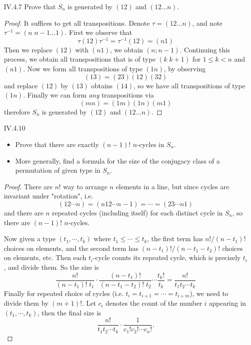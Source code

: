 \begin{problem}{IV.4.7}
Prove that $S_n$ is generated by $(12)$ and $(12\dotsc n)$.
\end{problem}
\begin{proof}
It suffices to get all transpositions. Denote $\tau = (12\dotsc n)$, and note $\tau^{-1}=(n \; n-1 \dotsc 1)$. First we observe that 
\[
\tau(12)\tau^{-1} = \tau^{-1}(12) = (n 1)
\]
Then we replace $(12)$ with $(n 1)$, we obtain $(n ; n-1)$. Continuing this process, we obtain all transpositions that is of type $(k \; k+1)$ for $1 \leq k < n$ and $(n 1)$. Now we form all transpositions of type $(1 n)$, by observing
\[
(1 3) = (2 3)(1 2)(3 2)	
\]
and replace $(1 2)$ by $(1 3)$ obtains $(1 4)$, so we have all transpositions of type $(1 n)$. Finally we can form \emph{any} transpositions via
\[
(m n) = (1 m)(1 n)(m 1)	
\]
therefore $S_n$ is generated by $(12)$ and $(12\dotsc n)$.
\end{proof}

\begin{problem}{IV.4.10} \
\begin{itemize}
\setlength\itemsep{0pt}
\item Prove that there are exactly $(n-1)!$ $n$-cycles in $S_n$.
\item More generally, find a formula for the size of the conjugacy class of a permutation of given type in $S_n$.
\end{itemize}
\end{problem}
\begin{proof}
There are $n!$ way to arrange $n$ elements in a line, but since cycles are invariant under "rotation", i.e.
\[
(1 2 \cdots n) = (n 1 2 \cdots n-1) = \cdots = (2 3 \cdots n 1)	
\]
and there are $n$ repeated cycles (including itself) for each distinct cycle in $S_n$, so there are $(n-1)!$ $n$-cycles.

Now given a type $(t_1,\cdots ,t_k)$ where $t_1 \leq \cdots \leq t_k$, the first term has $n!/(n-t_1)!$ choices on elements, and the second term has $(n-t_1)!/(n-t_1-t_2)!$ choices on elements, etc. Then each $t_i$-cycle counts its repeated cycle, which is precisely $t_i$, and divide them. So the size is
\[
\frac{n!}{(n-t_1)!\;t_1} \cdot \frac{(n-t_1)!}{(n-t_1-t_2)!\;t_2} \cdots \frac{t_k!}{t_k} = \frac{n!}{t_1 t_2 \cdots t_k}
\]
Finally for repeated choice of cycles (i.e. $t_i = t_{i+1} = \cdots = t_{i+m}$), we need to divide them by $(m+1)!$. Let $c_i$ denotes the count of the number $i$ appearing in $(t_1,\cdots ,t_k)$, then the final size is
\[
\frac{n!}{t_1 t_2 \cdots t_k} \cdot \frac{1}{c_1! c_2! \cdots c_n!}.
\]
\end{proof}

